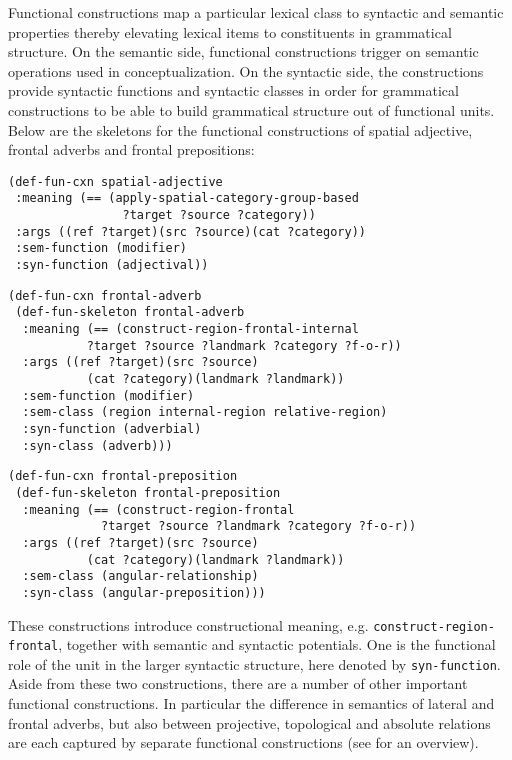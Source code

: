 Functional constructions map a particular lexical 
class to syntactic and semantic properties thereby
elevating lexical items to constituents in grammatical structure. 
On the semantic side, functional constructions trigger on semantic operations 
used in conceptualization. On the syntactic side, the constructions 
provide syntactic functions and syntactic classes in order for grammatical constructions 
to be able to build grammatical structure out of functional units.
Below are the skeletons for the functional constructions of spatial 
adjective, frontal adverbs and frontal prepositions:

\ea
\label{e:def-fun-spatial-adjective}
\begin{lstlisting}
(def-fun-cxn spatial-adjective 
 :meaning (== (apply-spatial-category-group-based 
                ?target ?source ?category))
 :args ((ref ?target)(src ?source)(cat ?category))
 :sem-function (modifier)
 :syn-function (adjectival))
\end{lstlisting}
\z

\ea
\label{e:7:def-fun-frontal-adverb}
\begin{lstlisting}
(def-fun-cxn frontal-adverb 
 (def-fun-skeleton frontal-adverb
  :meaning (== (construct-region-frontal-internal
           ?target ?source ?landmark ?category ?f-o-r))
  :args ((ref ?target)(src ?source)
           (cat ?category)(landmark ?landmark))
  :sem-function (modifier)
  :sem-class (region internal-region relative-region)
  :syn-function (adverbial)
  :syn-class (adverb)))
\end{lstlisting}
\z

\ea
\label{e:def-fun-frontal-preposition}
\begin{lstlisting}
(def-fun-cxn frontal-preposition
 (def-fun-skeleton frontal-preposition
  :meaning (== (construct-region-frontal 
             ?target ?source ?landmark ?category ?f-o-r))
  :args ((ref ?target)(src ?source)
           (cat ?category)(landmark ?landmark))
  :sem-class (angular-relationship)
  :syn-class (angular-preposition)))
\end{lstlisting}
\z

These constructions introduce constructional meaning, e.g. 
{\footnotesize\tt construct-region-frontal}, together with semantic 
and syntactic potentials. One is the functional role of the
unit in the larger syntactic structure, here denoted by 
{\footnotesize\tt syn-function}. Aside from these two constructions, there are 
a number of other important functional constructions. 
In particular the difference in semantics of
lateral and frontal adverbs, but also between projective, topological
and absolute relations are each captured by separate 
functional constructions (see  for an overview).


